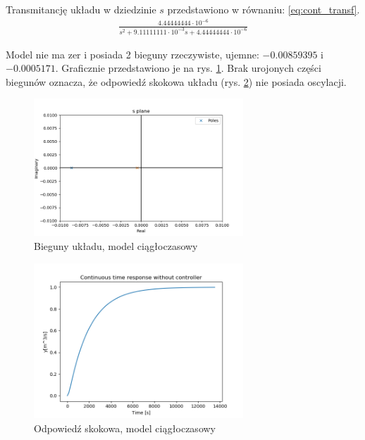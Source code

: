 \documentclass{article}
\begin{document}
Transmitancję układu w dziedzinie $s$ przedstawiono w równaniu: \ref{eq:cont_transf}.
\begin{equation}\label{eq:cont_transf}
 \begin{array}{l}
  \frac{4.44444444 \cdot 10^{-6}}{ s^2 + 9.11111111\cdot 10^{-3}s + 4.44444444 \cdot 10^{-6}}
\end{array}
\end{equation}

Model nie ma zer i posiada 2 bieguny rzeczywiste, ujemne: $-0.00859395$ i $-0.0005171$. Graficznie przedstawiono je na rys. \ref{fig:cont_poles}. Brak urojonych części biegunów oznacza, że odpowiedź skokowa układu (rys. \ref{fig:step_resp_cont}) nie posiada oscylacji. 

\begin{figure}[H]
    \centering
    \includegraphics[width=0.7\textwidth]{img/cont_poles.png}
    \caption{Bieguny układu, model ciągłoczasowy}
    \label{fig:cont_poles}
\end{figure}

\begin{figure}[H]
    \centering
    \includegraphics[width=0.7\textwidth]{img/step_resp_cont.png}
    \caption{Odpowiedź skokowa, model ciągłoczasowy}
    \label{fig:step_resp_cont}
\end{figure}
\end{document}
